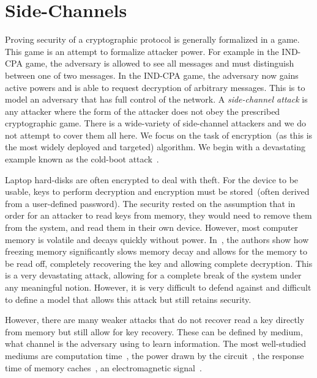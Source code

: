 \documentclass{article}
\begin{document}
\section{Side-Channels}\label{sec:side channels}
Proving security of a cryptographic protocol is generally formalized in a game.  This game is an attempt to formalize attacker power.  For example in the IND-CPA game, the adversary is allowed to see all messages and must distinguish between one of two messages.  In the IND-CPA game, the adversary now gains active powers and is able to request decryption of arbitrary messages.  This is to model an adversary that has full control of the network.  A \emph{side-channel attack} is any attacker where the form of the attacker does not obey the prescribed cryptographic game.  There is a wide-variety of side-channel attackers and we do not attempt to cover them all here.  We focus on the task of encryption~(as this is the most widely deployed and targeted) algorithm.  We begin with a devastating example known as the cold-boot attack~\cite{coldboot}.

Laptop hard-disks are often encrypted to deal with theft.  For the device to be usable, keys to perform decryption and encryption must be stored~(often derived from a user-defined password).  The security rested on the assumption that in order for an attacker to read keys from memory, they would need to remove them from the system, and read them in their own device.  However, most computer memory is volatile and decays quickly without power.  In~\cite{coldboot}, the authors show how freezing memory significantly slows memory decay and allows for the memory to be read off, completely recovering the key and allowing complete decryption.  This is a very devastating attack, allowing for a complete break of the system under any meaningful notion.  However, it is very difficult to defend against and difficult to define a model that allows this attack but still retains security.

However, there are many weaker attacks that do not recover read a key directly from memory but still allow for key recovery.  These can be defined by medium, what channel is the adversary using to learn information.  The most well-studied mediums are computation time~\cite{kocherTiming}, the power drawn by the circuit~\cite{kocherDPA}, the response time of memory caches~\cite{Bernstein05cache-timingattacks, Tromer:2010fk}, an electromagnetic signal~\cite{DEMAConcrete,DEMASmartCards}.


\end{document}
